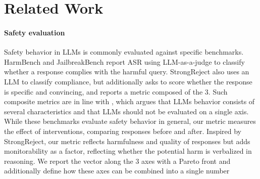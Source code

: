 \section{Related Work}
\label{sec:related}

\paragraph{Safety evaluation}
Safety behavior in LLMs is commonly evaluated against specific benchmarks. HarmBench \citep{mazeika2024harmbench} and JailbreakBench \citep{chao2024jailbreakbench} report ASR using LLM-as-a-judge to classify whether a response complies with the harmful query. StrongReject \citep{souly2024strongreject} also uses an LLM to classify compliance, but additionally asks to score whether the response is specific and convincing, and reports a metric composed of the 3. Such composite metrics are in line with \citep{liang2023helm}, which argues that LLMs behavior consists of several characteristics and that LLMs should not be evaluated on a single axis. 
\\
While these benchmarks evaluate safety behavior in general, our metric measures the effect of interventions, comparing responses before and after.
Inspired by StrongReject, our metric reflects harmfulness and quality of responses but adds monitorability as a factor, reflecting whether the potential harm is verbalized in reasoning. We report the vector along the 3 axes with a Pareto front and additionally define how these axes can be combined into a single number


